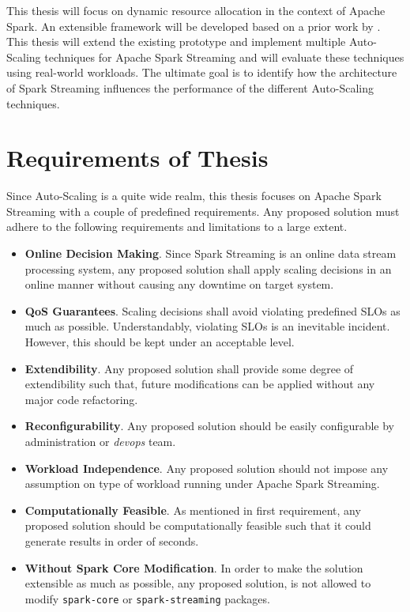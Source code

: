 This thesis will focus on dynamic resource allocation in the context of Apache Spark. An extensible framework will be developed based on a prior work by \textcite{Michal:2017}. This thesis will extend the existing prototype and implement multiple Auto-Scaling techniques for Apache Spark Streaming and will evaluate these techniques using real-world workloads. The ultimate goal is to identify how the architecture of Spark Streaming influences the performance of the different Auto-Scaling techniques.

\section{Requirements of Thesis}
Since Auto-Scaling is a quite wide realm, this thesis focuses on Apache Spark Streaming with a couple of predefined requirements. Any proposed solution must adhere to the following requirements and limitations to a large extent.
\begin{itemize}
    \item \textbf{Online Decision Making}. Since Spark Streaming is an online data stream processing system, any proposed solution shall apply scaling decisions in an online manner without causing any downtime on target system.
    \item \textbf{QoS Guarantees}. Scaling decisions shall avoid violating predefined SLOs as much as possible. Understandably, violating SLOs is an inevitable incident. However, this should be kept under an acceptable level.
    \item \textbf{Extendibility}. Any proposed solution shall provide some degree of extendibility such that, future modifications can be applied without any major code refactoring.
    \item \textbf{Reconfigurability}. Any proposed solution should be easily configurable by administration or \emph{devops} team.
    \item \textbf{Workload Independence}. Any proposed solution should not impose any assumption on type of workload running under Apache Spark Streaming.
    \item \textbf{Computationally Feasible}. As mentioned in first requirement, any proposed solution should be computationally feasible such that it could generate results in order of seconds.
    \item \textbf{Without Spark Core Modification}. In order to make the solution extensible as much as possible, any proposed solution, is not allowed to modify \lstinline$spark-core$ or \lstinline$spark-streaming$ packages.
\end{itemize}

